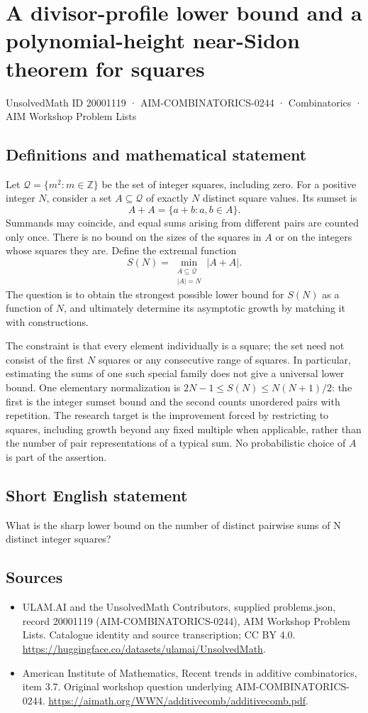 \documentclass[11pt,a4paper]{article}
\begin{document}
\section*{A divisor-profile lower bound and a polynomial-height near-Sidon theorem for squares}\label{20001119}
{\small UnsolvedMath ID 20001119 · AIM-COMBINATORICS-0244 · Combinatorics · AIM Workshop Problem Lists}
\subsection{Definitions and mathematical statement}
Let $\mathcal Q=\{m^2:m\in\mathbb Z\}$ be the set of integer
squares, including zero. For a positive integer $N$, consider a set
$A\subseteq\mathcal Q$ of exactly $N$ distinct square values.
Its sumset is
\[
                         A+A=\{a+b:a,b\in A\}.
\]
Summands may coincide, and equal sums arising from different pairs
are counted only once. There is no bound on the sizes of the squares
in $A$ or on the integers whose squares they are.
Define the extremal function
\[
                         S(N)=\min_{\substack{A\subseteq\mathcal Q\\|A|=N}}
                                      |A+A|.
\]
The question is to obtain the strongest possible lower bound for
$S(N)$ as a function of $N$, and ultimately determine its asymptotic
growth by matching it with constructions.

The constraint is that every element individually is a square; the
set need not consist of the first $N$ squares or any consecutive
range of squares. In particular, estimating the sums of one such
special family does not give a universal lower bound.
One elementary normalization is $2N-1\le S(N)\le N(N+1)/2$:
the first is the integer sumset bound and the second counts unordered
pairs with repetition. The research target is the improvement forced
by restricting to squares, including growth beyond any fixed
multiple when applicable, rather than the number of pair
representations of a typical sum. No probabilistic choice of $A$
is part of the assertion.
\subsection{Short English statement}
What is the sharp lower bound on the number of distinct pairwise sums of N distinct integer squares?
\subsection{Sources}
\begin{itemize}
\item[S1] ULAM.AI and the UnsolvedMath Contributors, supplied problems.json, record 20001119 (AIM-COMBINATORICS-0244), AIM Workshop Problem Lists. Catalogue identity and source transcription; CC BY 4.0.
\url{https://huggingface.co/datasets/ulamai/UnsolvedMath}.
\item[S2] American Institute of Mathematics, Recent trends in additive combinatorics, item 3.7. Original workshop question underlying AIM-COMBINATORICS-0244.
\url{https://aimath.org/WWN/additivecomb/additivecomb.pdf}.
\end{itemize}
\end{document}
